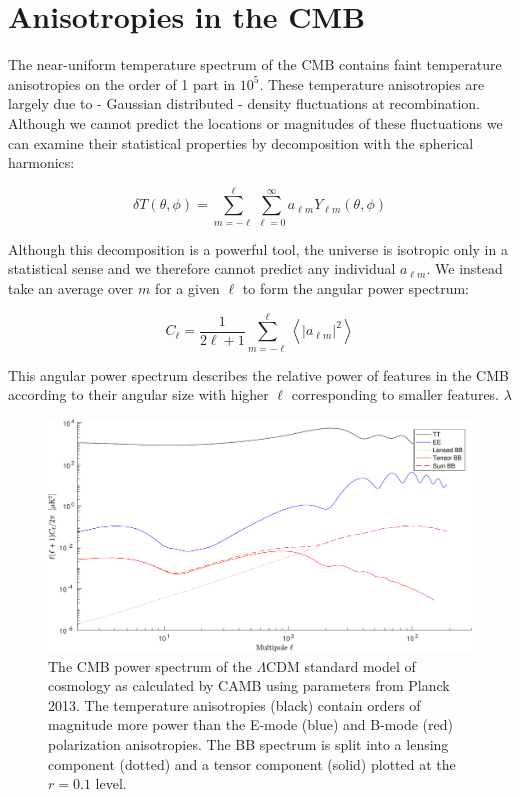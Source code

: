 \documentclass[12pt]{article}
\begin{document}
\section{Anisotropies in the CMB}
The near-uniform temperature spectrum of the CMB contains faint temperature
anisotropies on the order of 1 part in $10^5$. These temperature anisotropies
are largely due to - Gaussian distributed - density fluctuations at
recombination. Although we cannot predict the locations or magnitudes of these
fluctuations we can examine their statistical properties by decomposition with
the spherical harmonics:

\begin{equation}
	\delta T(\theta,\phi) = \sum _{m=-\ell} ^\ell \sum _{\ell=0} ^\infty
	a_{\ell m}Y_{\ell m}(\theta,\phi)
\end{equation}

Although this decomposition is a powerful tool, the universe is isotropic only
in a statistical sense and we therefore cannot predict any individual $a_{\ell
m}$. We instead take an average over $m$ for a given $\ell$ to form the
angular power spectrum:


\begin{equation}
	C_\ell = \frac{1}{2\ell +1}\sum _{m=-\ell} ^\ell \left< |a_{\ell m}|^2
	\right>
\end{equation}

This angular power spectrum describes the relative power of features in the
CMB according to their angular size with higher $\ell$ corresponding to
smaller features. $\lambda$

\begin{figure}
	\includegraphics[width=\textwidth]{theory_aps.pdf}
	\caption{The CMB power spectrum of the $\Lambda$CDM standard model of
	cosmology as calculated by CAMB using parameters from Planck 2013. The
	temperature anisotropies (black) contain orders of magnitude more power
	than the E-mode (blue) and B-mode (red) polarization anisotropies. The BB
	spectrum is split into a lensing component (dotted) and a tensor component
	(solid) plotted at the $r=0.1$ level.}
	\label{fig:theory_aps}

\end{figure}
\end{document}
